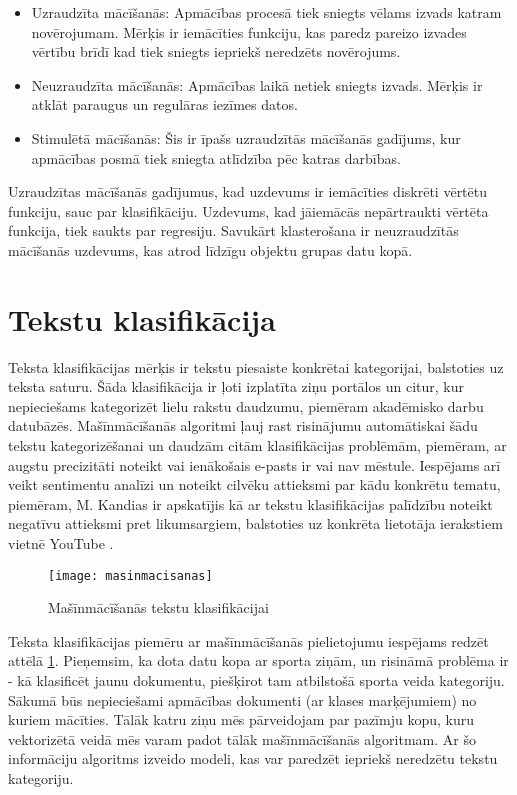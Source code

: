 \begin{itemize}
\item Uzraudzīta mācīšanās: Apmācības procesā tiek sniegts vēlams izvads katram novērojumam. Mērķis ir iemācīties funkciju, kas paredz pareizo izvades vērtību brīdī kad tiek sniegts iepriekš neredzēts novērojums.
\item Neuzraudzīta mācīšanās: Apmācības laikā netiek sniegts izvads. Mērķis ir atklāt paraugus un regulāras iezīmes datos.
\item Stimulētā mācīšanās: Šis ir īpašs uzraudzītās mācīšanās gadījums, kur apmācības posmā tiek sniegta atlīdzība pēc katras darbības.
\end{itemize}

Uzraudzītas mācīšanās gadījumus, kad uzdevums ir iemācīties diskrēti vērtētu funkciju, sauc par klasifikāciju. Uzdevums, kad jāiemācās nepārtraukti vērtēta funkcija, tiek saukts par regresiju. Savukārt klasterošana ir neuzraudzītās mācīšanās uzdevums, kas atrod līdzīgu objektu grupas datu kopā.

\section{Tekstu klasifikācija}

Teksta klasifikācijas mērķis ir tekstu piesaiste konkrētai kategorijai, balstoties uz teksta saturu. Šāda klasifikācija ir ļoti izplatīta ziņu portālos un citur, kur nepieciešams kategorizēt lielu rakstu daudzumu, piemēram akadēmisko darbu datubāzēs. Mašīnmācīšanās algoritmi ļauj rast risinājumu automātiskai šādu tekstu kategorizēšanai un daudzām citām klasifikācijas problēmām, piemēram, ar augstu precizitāti noteikt vai ienākošais e-pasts ir vai nav mēstule. Iespējams arī veikt sentimentu analīzi un noteikt cilvēku attieksmi par kādu konkrētu tematu, piemēram, M. Kandias ir apskatījis kā ar tekstu klasifikācijas palīdzību noteikt negatīvu attieksmi pret likumsargiem, balstoties uz konkrēta lietotāja ierakstiem vietnē YouTube \cite{threatdetectionyoutube}.

\begin{figure}[H]
	\texttt{[image: masinmacisanas]}
	\caption{Mašīnmācīšanās tekstu klasifikācijai}
	\label{fig:masinmacisanas}
\end{figure}

Teksta klasifikācijas piemēru ar mašīnmācīšanās pielietojumu iespējams redzēt attēlā  \ref{fig:masinmacisanas}. Pieņemsim, ka dota datu kopa ar sporta ziņām, un risināmā problēma ir - kā klasificēt jaunu dokumentu, piešķirot tam atbilstošā sporta veida kategoriju. Sākumā būs nepieciešami apmācības dokumenti (ar klases marķējumiem) no kuriem mācīties. Tālāk katru ziņu mēs pārveidojam par pazīmju kopu, kuru vektorizētā veidā mēs varam padot tālāk mašīnmācīšanās algoritmam. Ar šo informāciju algoritms izveido modeli, kas var paredzēt iepriekš neredzētu tekstu kategoriju.

